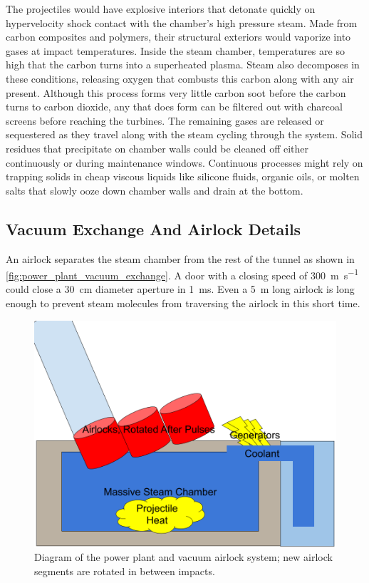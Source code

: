 \documentclass{article}
\begin{document}
The projectiles would have explosive interiors that detonate quickly on hypervelocity shock contact with the chamber's high pressure steam. Made from carbon composites and polymers, their structural exteriors would vaporize into gases at impact temperatures. Inside the steam chamber, temperatures are so high that the carbon turns into a superheated plasma. Steam also decomposes in these conditions, releasing oxygen that combusts this carbon along with any air present. Although this process forms very little carbon soot before the carbon turns to carbon dioxide, any that does form can be filtered out with charcoal screens before reaching the turbines.   The remaining gases are released or sequestered as they travel along with the steam cycling through the system.   Solid residues that precipitate on chamber walls could be cleaned off either continuously or during maintenance windows.  Continuous processes might rely on trapping solids in cheap viscous liquids like silicone fluids, organic oils, or molten salts that slowly ooze down chamber walls and drain at the bottom.  

\subsection{Vacuum Exchange And Airlock Details}
An airlock separates the steam chamber from the rest of the tunnel as shown in \autoref{fig:power_plant_vacuum_exchange}.   A door with a closing speed of \SI{300}{\meter\per\second} could close a \SI{30}{\centi\meter} diameter aperture in \SI{1}{\milli\second}.  Even a \SI{5}{\meter} long airlock is long enough to prevent steam molecules from traversing the airlock in this short time.  

\begin{figure}[htpb]
    \centering
    \includegraphics[width=0.5\linewidth]{images/Power Plant Cooling and Generators.png}
    \caption{Diagram of the power plant and vacuum airlock system; new airlock segments are rotated in between impacts.}
    \label{fig:power_plant_vacuum_exchange}
\end{figure}
\end{document}
